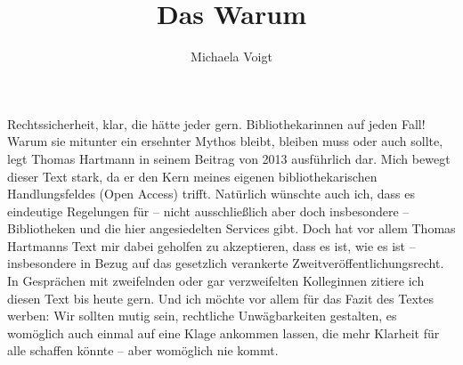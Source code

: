 \documentclass[output=paper]{langsci/langscibook}
\title{Das Warum}
\author{Michaela Voigt  \affiliation{Technische Universität Berlin, Universitätsbibliothek}}
\begin{document}
\maketitle

\noindent Rechtssicherheit, klar, die hätte jede\*r gern. Bibliothekar\*innen auf jeden Fall! Warum sie mitunter ein ersehnter Mythos bleibt, bleiben muss oder auch sollte, legt Thomas Hartmann in seinem Beitrag von 2013 ausführlich dar. Mich bewegt dieser Text stark, da er den Kern meines eigenen bibliothekarischen Handlungsfeldes (Open Access) trifft. Natürlich wünschte auch ich, dass es eindeutige Regelungen für -- nicht ausschließlich aber doch insbesondere -- Bibliotheken und die hier angesiedelten Services gibt. Doch hat vor allem Thomas Hartmanns Text mir dabei geholfen zu akzeptieren, dass es ist, wie es ist -- insbesondere in Bezug auf das gesetzlich verankerte Zweitveröffentlichungsrecht. In Gesprächen mit zweifelnden oder gar verzweifelten Kolleg\*innen zitiere ich diesen Text bis heute gern. Und ich möchte vor allem für das Fazit des Textes werben: Wir sollten mutig sein, rechtliche Unwägbarkeiten gestalten, es womöglich auch einmal auf eine Klage ankommen lassen, die mehr Klarheit für alle schaffen könnte -- aber womöglich nie kommt.
\end{document}
